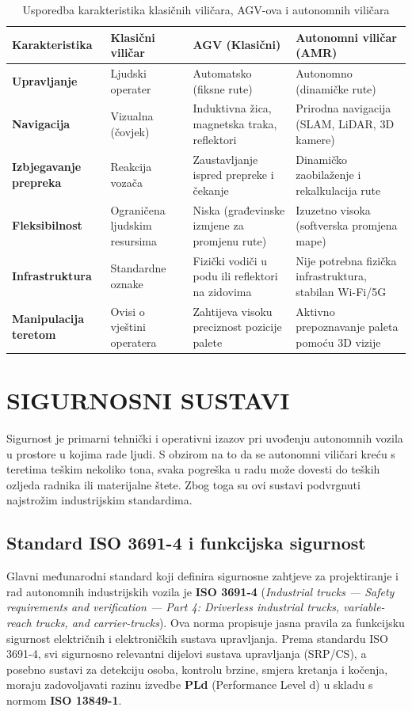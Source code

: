 \documentclass[12pt,a4paper]{article}
\begin{document}
\begin{table}[h]
\centering
\caption{Usporedba karakteristika klasičnih viličara, AGV-ova i autonomnih viličara}
\label{tab:usporedba}
\begin{tabularx}{\textwidth}{|l|X|X|X|}
\hline
\textbf{Karakteristika} & \textbf{Klasični viličar} & \textbf{AGV (Klasični)} & \textbf{Autonomni viličar (AMR)} \\ \hline
\textbf{Upravljanje} & Ljudski operater & Automatsko (fiksne rute) & Autonomno (dinamičke rute) \\ \hline
\textbf{Navigacija} & Vizualna (čovjek) & Induktivna žica, magnetska traka, reflektori & Prirodna navigacija (SLAM, LiDAR, 3D kamere) \\ \hline
\textbf{Izbjegavanje prepreka} & Reakcija vozača & Zaustavljanje ispred prepreke i čekanje & Dinamičko zaobilaženje i rekalkulacija rute \\ \hline
\textbf{Fleksibilnost} & Ograničena ljudskim resursima & Niska (građevinske izmjene za promjenu rute) & Izuzetno visoka (softverska promjena mape) \\ \hline
\textbf{Infrastruktura} & Standardne oznake & Fizički vodiči u podu ili reflektori na zidovima & Nije potrebna fizička infrastruktura, stabilan Wi-Fi/5G \\ \hline
\textbf{Manipulacija teretom} & Ovisi o vještini operatera & Zahtijeva visoku preciznost pozicije palete & Aktivno prepoznavanje paleta pomoću 3D vizije \\ \hline
\end{tabularx}
\end{table}

\section{SIGURNOSNI SUSTAVI}
Sigurnost je primarni tehnički i operativni izazov pri uvođenju autonomnih vozila u prostore u kojima rade ljudi. S obzirom na to da se autonomni viličari kreću s teretima teškim nekoliko tona, svaka pogreška u radu može dovesti do teških ozljeda radnika ili materijalne štete. Zbog toga su ovi sustavi podvrgnuti najstrožim industrijskim standardima.

\subsection{Standard ISO 3691-4 i funkcijska sigurnost}
Glavni međunarodni standard koji definira sigurnosne zahtjeve za projektiranje i rad autonomnih industrijskih vozila je \textbf{ISO 3691-4} (\textit{Industrial trucks — Safety requirements and verification — Part 4: Driverless industrial trucks, variable-reach trucks, and carrier-trucks}). Ova norma propisuje jasna pravila za funkcijsku sigurnost električnih i elektroničkih sustava upravljanja. Prema standardu ISO 3691-4, svi sigurnosno relevantni dijelovi sustava upravljanja (SRP/CS), a posebno sustavi za detekciju osoba, kontrolu brzine, smjera kretanja i kočenja, moraju zadovoljavati razinu izvedbe \textbf{PLd} (Performance Level d) u skladu s normom \textbf{ISO 13849-1}.
\end{document}
